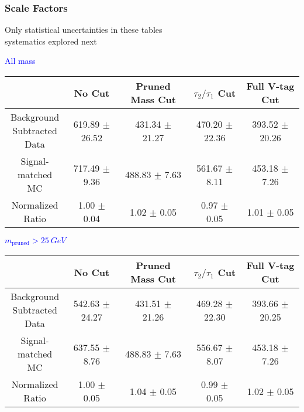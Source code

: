 \documentclass{beamer}
\begin{document}
\begin{frame}
  \frametitle{Scale Factors}
  Only statistical uncertainties in these tables \\ systematics explored next
  \begin{adjustwidth}{-1.5em}{-1.5em}
    \centering
    \vspace{6pt}
    \textcolor{blue}{All mass}
    \vspace{6pt}

    {\scriptsize
      \begin{tabular}{c | c | c | c | c}
        \hline
        & No Cut & Pruned Mass Cut & $\tau_2/\tau_1$ Cut & Full V-tag Cut \\
        \hline
        \makecell{Background \\ Subtracted \\ Data} & 619.89 $\pm$ 26.52 & 431.34 $\pm$ 21.27 & 470.20 $\pm$ 22.36 & 393.52 $\pm$ 20.26 \\
        \makecell{Signal-\\ matched MC} & 717.49 $\pm$ 9.36 & 488.83 $\pm$ 7.63 & 561.67 $\pm$ 8.11 & 453.18 $\pm$ 7.26 \\
        \hline
        \makecell{Normalized \\ Ratio} & 1.00 $\pm$ 0.04 & 1.02 $\pm$ 0.05 & 0.97 $\pm$ 0.05 & 1.01 $\pm$ 0.05 \\
        \hline
      \end{tabular}
    }

    \vspace{6pt}
    \textcolor{blue}{$m_\text{pruned} > \SI{25}{GeV}$}
    \vspace{6pt}

    {\scriptsize
      \begin{tabular}{c | c | c | c | c}
        \hline
        & No Cut & Pruned Mass Cut & $\tau_2/\tau_1$ Cut & Full V-tag Cut \\
        \hline
        \makecell{Background \\ Subtracted \\ Data} & 542.63 $\pm$ 24.27 & 431.51 $\pm$ 21.26 & 469.28 $\pm$ 22.30 & 393.66 $\pm$ 20.25 \\
        \makecell{Signal-\\ matched MC} & 637.55 $\pm$ 8.76 & 488.83 $\pm$ 7.63 & 556.67 $\pm$ 8.07 & 453.18 $\pm$ 7.26 \\
        \hline
        \makecell{Normalized \\ Ratio} & 1.00 $\pm$ 0.05 & 1.04 $\pm$ 0.05 & 0.99 $\pm$ 0.05 & 1.02 $\pm$ 0.05 \\
        \hline
      \end{tabular}
    }
  \end{adjustwidth}
\end{frame}
\end{document}
